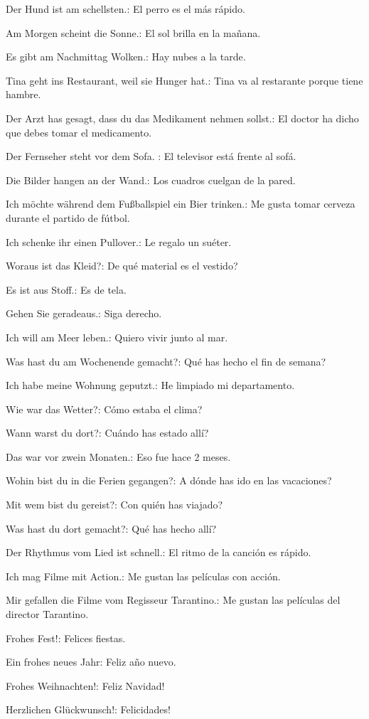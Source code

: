 \begin{myitemize}
\item Der Hund ist am schellsten.: El perro es el más rápido.
\item Am Morgen scheint die Sonne.: El sol brilla en la mañana.
\item Es gibt am Nachmittag Wolken.: Hay nubes a la tarde.
\item Tina geht ins Restaurant, weil sie Hunger hat.: Tina va al restarante porque tiene hambre.
\item Der Arzt has gesagt, dass du das Medikament nehmen sollst.: El doctor ha dicho que debes tomar el medicamento.
\item Der Fernseher steht vor dem Sofa. : El televisor está frente al sofá.
\item Die Bilder hangen an der Wand.: Los cuadros cuelgan de la pared.
\item Ich möchte während dem Fußballspiel ein Bier trinken.: Me gusta tomar cerveza durante el partido de fútbol.
\item Ich schenke ihr einen Pullover.: Le regalo un suéter.
\item Woraus ist das Kleid?: De qué material es el vestido?
\item Es ist aus Stoff.: Es de tela.
\item Gehen Sie geradeaus.: Siga derecho.
\item Ich will am Meer leben.: Quiero vivir junto al mar.
\item Was hast du am Wochenende gemacht?: Qué has hecho el fin de semana?
\item Ich habe meine Wohnung geputzt.: He limpiado mi departamento.
\item Wie war das Wetter?: Cómo estaba el clima?
\item Wann warst du dort?: Cuándo has estado allí?
\item Das war vor zwein Monaten.: Eso fue hace 2 meses.
\item Wohin bist du in die Ferien gegangen?: A dónde has ido en las vacaciones?
\item Mit wem bist du gereist?: Con quién has viajado?
\item Was hast du dort gemacht?: Qué has hecho allí? 
\item Der Rhythmus vom Lied ist schnell.: El ritmo de la canción es rápido.
\item Ich mag Filme mit Action.: Me gustan las películas con acción.
\item Mir gefallen die Filme vom Regisseur Tarantino.: Me gustan las películas del director Tarantino.
\item Frohes Fest!: Felices fiestas.
\item Ein frohes neues Jahr: Feliz año nuevo.
\item Frohes Weihnachten!: Feliz Navidad!
\item Herzlichen Glückwunsch!: Felicidades!
\end{myitemize}

